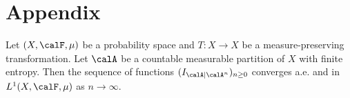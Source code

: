 \section{Appendix}

  \begin{theorem}
    Let $(X, \calF, \mu)$ be a probability space and $T: X \to X$ be a measure-preserving transformation. 
    Let $\calA$ be a countable measurable partition of $X$ with finite entropy. 
    Then the sequence of functions $(I_{\calA | \calA^n})_{n \geq 0}$ converges a.e. and in $L^1(X, \calF, \mu)$ as $n \to \infty$. 
     \Yang{}
    
  \end{theorem}